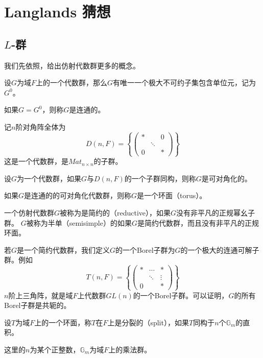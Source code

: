 

\chapter{Langlands 猜想}
\label{cha:china}

\section{$L$-群}
  我们先依照，给出仿射代数群更多的概念。

  设$G$为域$F$上的一个代数群，那么$G$有唯一一个极大不可约子集包含单位元，记为$G^0$。
  \begin{definition}
  如果$G = G^0$，则称$G$是连通的。
  \end{definition}
  记$n$阶对角阵全体为
  $$D(n,F) = \left\{\left(
  \begin{array}{lll}
  \ast & & 0 \\
  & \ddots & \\
  0 & & \ast
  \end{array}
  \right)\right\}$$
  这是一个代数群，是$Mat_{n\times n}$的子群。
  \begin{definition}
  设$G$为一个代数群，如果$G$与$D(n,F)$的一个子群同构，则称$G$是可对角化的。
  \end{definition}
  \begin{definition}
  如果$G$是连通的的可对角化代数群，则称$G$是一个环面（torus）。
  \end{definition}
  \begin{definition}
  一个仿射代数群$G$被称为是简约的（reductive），如果$G$没有非平凡的正规幂幺子群。
  $G$被称为半单（semisimple）的如果$G$是简约代数群，而且没有非平凡的正规环面。
  \end{definition}
  若$G$是一个简约代数群，我们定义$G$的一个Borel子群为$G$的一个极大的连通可解子群。例如
  $$T(n,F) = \left\{\left(
  \begin{array}{lll}
  \ast & \cdots & \ast \\
  & \ddots & \vdots \\
  0 & & \ast
  \end{array}
  \right)\right\}$$
  $n$阶上三角阵，就是域$F$上代数群$GL(n)$的一个Borel子群。可以证明，$G$的所有Borel子群是共轭的。

  \begin{definition}
  设$T$为域$F$上的一个环面，称$T$在$F$上是分裂的（split），如果$T$同构于$n$个$\mathbb{G}_m$的直积。
  \end{definition}
  这里的$n$为某个正整数，$\mathbb{G}_m$为域$F$上的乘法群。

